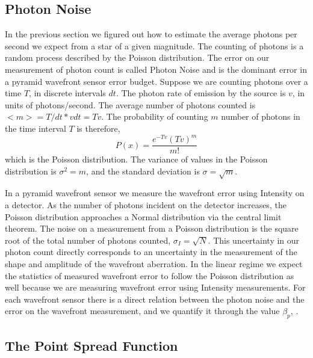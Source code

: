 \subsection{Photon Noise}

In the previous section we figured out how to estimate the average photons per second we expect from a star of a given magnitude. The counting of photons is a random process described by the Poisson distribution. The error on our measurement of photon count is called Photon Noise and is the dominant error in a pyramid wavefront sensor error budget. Suppose we are counting photons over a time $T$, in discrete intervals $dt$. The photon rate of emission by the source is $v$, in units of photons/second. The average number of photons counted is $<m>=T/dt * vdt=Tv$. The probability of counting $m$ number of photons in the time interval $T$ is therefore,
\begin{equation}
    P(x)=\frac{e^{-Tv} (Tv)^m}{m!}
\end{equation}
which is the Poisson distribution. The variance of values in the Poisson distribution is $\sigma^2=m$, and the standard deviation is $\sigma=\sqrt{m}$. 

In a pyramid wavefront sensor we measure the wavefront error using Intensity on a detector. As the number of photons incident on the detector increases, the Poisson distribution approaches a Normal distribution via the central limit theorem. The noise on a measurement from a Poisson distribution is the square root of the total number of photons counted, $\sigma_I=\sqrt{N}.$ This uncertainty in our photon count directly corresponds to an uncertainty in the measurement of the shape and amplitude of the wavefront aberration. In the linear regime we expect the statistics of measured wavefront error to follow the Poisson distribution as well because we are measuring wavefront error using Intensity measurements. For each wavefront sensor there is a direct relation between the photon noise and the error on the wavefront measurement, and we quantify it through the value $\beta_p $, \cite{guyon2005}.

\subsection{The Point Spread Function}

